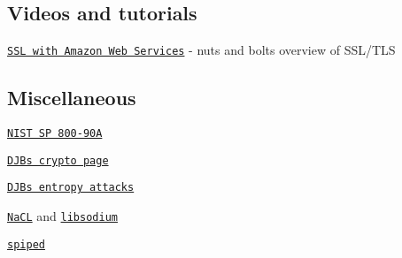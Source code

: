 \subsection*{Videos and tutorials}


\begin{DoxyItemize}
\item \href{https://www.youtube.com/watch?v=8AODa_AazY4}{\tt S\+SL with Amazon Web Services} -\/ nuts and bolts overview of S\+S\+L/\+T\+LS
\end{DoxyItemize}

\subsection*{Miscellaneous}


\begin{DoxyItemize}
\item \href{http://csrc.nist.gov/publications/nistpubs/800-90A/SP800-90A.pdf}{\tt N\+I\+ST SP 800-\/90A}
\item \href{http://cr.yp.to/crypto.html}{\tt D\+J\+Bs crypto page}
\item \href{http://blog.cr.yp.to/20140205-entropy.html}{\tt D\+J\+Bs entropy attacks}
\item \href{http://nacl.cr.yp.to/}{\tt Na\+CL} and \href{https://github.com/jedisct1/libsodium}{\tt libsodium}
\item \href{http://www.tarsnap.com/spiped.html}{\tt spiped} 
\end{DoxyItemize}